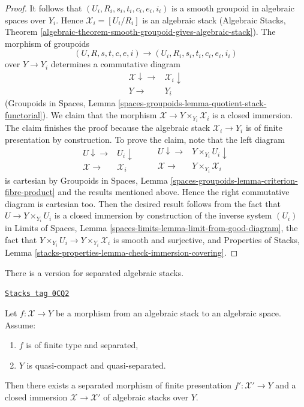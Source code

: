 \begin{proof}
\medskip\noindent
It follows that $(U_i, R_i, s_i, t_i, c_i, e_i, i_i)$
is a smooth groupoid in algebraic spaces over $Y_i$.
Hence $\mathcal{X}_i = [U_i/R_i]$ is an algebraic stack
(Algebraic Stacks, Theorem
\ref{algebraic-theorem-smooth-groupoid-gives-algebraic-stack}).
The morphism of groupoids
$$
(U, R, s, t, c, e, i) \to (U_i, R_i, s_i, t_i, c_i, e_i, i_i)
$$
over $Y \to Y_i$ determines a commutative diagram
$$
\begin{array}{cc}\mathcal{X} \downarrow\longrightarrow & \mathcal{X}_i \downarrow \\ Y \longrightarrow & Y_i\end{array}
$$
(Groupoids in Spaces, Lemma
\ref{spaces-groupoids-lemma-quotient-stack-functorial}).
We claim that the morphism $\mathcal{X} \to Y \times_{Y_i} \mathcal{X}_i$
is a closed immersion. The claim finishes the proof because
the algebraic stack $\mathcal{X}_i \to Y_i$ is of finite presentation
by construction. To prove the claim, note that the left diagram
$$
\begin{array}{cc}U \downarrow\longrightarrow & U_i \downarrow \\ \mathcal{X} \longrightarrow & \mathcal{X}_i\end{array}
\quad\quad
\begin{array}{cc}U \downarrow\longrightarrow & Y \times_{Y_i} U_i \downarrow \\ \mathcal{X} \longrightarrow & Y \times_{Y_i} \mathcal{X}_i\end{array}
$$
is cartesian by Groupoids in Spaces, Lemma
\ref{spaces-groupoids-lemma-criterion-fibre-product}
and the results mentioned above.
Hence the right commutative diagram is cartesian too.
Then the desired result follows from the fact that
$U \to Y \times_{Y_i} U_i$ is a closed immersion
by construction of the inverse system $(U_i)$ in
Limits of Spaces, Lemma \ref{spaces-limits-lemma-limit-from-good-diagram},
the fact that $Y \times_{Y_i} U_i \to Y \times_{Y_i} \mathcal{X}_i$
is smooth and surjective, and Properties of Stacks, Lemma
\ref{stacks-properties-lemma-check-immersion-covering}.
\end{proof}

There is a version for separated algebraic stacks.

\begin{lemma}
\label{stacks-limits-lemma-separated-closed-in-finite-presentation}
\href{https://stacks.math.columbia.edu/tag/0CQ2}{\texttt{Stacks tag 0CQ2}}

Let $f : \mathcal{X} \to Y$ be a morphism from an algebraic stack
to an algebraic space. Assume:
\begin{enumerate}
\item $f$ is of finite type and separated,
\item $Y$ is quasi-compact and quasi-separated.
\end{enumerate}
Then there exists a separated morphism of finite presentation
$f' : \mathcal{X}' \to Y$ and a closed immersion
$\mathcal{X} \to \mathcal{X}'$ of
algebraic stacks over $Y$.
\end{lemma}

